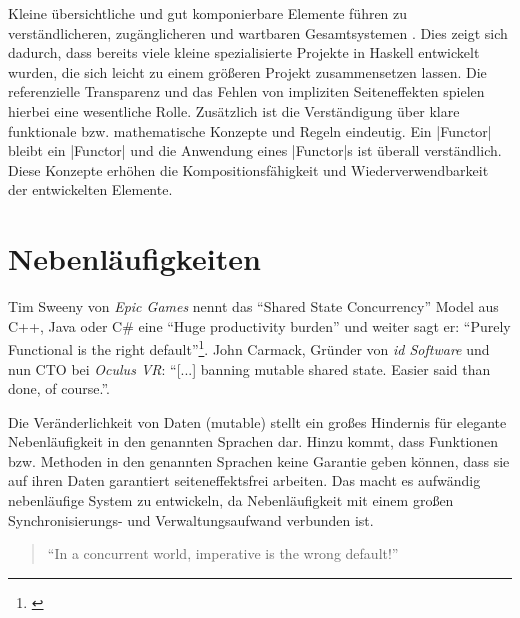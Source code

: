 Kleine übersichtliche und gut komponierbare Elemente führen zu verständlicheren, zugänglicheren und wartbaren Gesamtsystemen \parencite[Seite 12 ff.]{Stewart2015}. Dies zeigt sich dadurch, dass bereits viele kleine spezialisierte Projekte in Haskell entwickelt wurden, die sich leicht zu einem größeren Projekt zusammensetzen lassen. Die referenzielle Transparenz und das Fehlen von impliziten Seiteneffekten spielen hierbei eine wesentliche Rolle. Zusätzlich ist die Verständigung über klare funktionale bzw. mathematische Konzepte und Regeln eindeutig. Ein |Functor| bleibt ein |Functor| und die Anwendung eines |Functor|s ist überall verständlich. Diese Konzepte erhöhen die Kompositionsfähigkeit und Wiederverwendbarkeit der entwickelten Elemente.

\section{Nebenläufigkeiten}
\label{sec:nebenlaeufigkeiten}

Tim Sweeny von \textit{Epic Games} nennt das "`Shared State Concurrency"' Model aus C++, Java oder C\# eine "`Huge productivity burden"' und weiter sagt er: "`Purely Functional is the right default"'\footnote{\cite[Vgl.][Seite 42 u. Seite 56]{Sweeney2006}\label{note:sweeney-mainstream}}. John Carmack, Gründer von \textit{id Software} und nun CTO bei \textit{Oculus VR}: "`[...] banning mutable shared state. Easier said than done, of course."'.

Die Veränderlichkeit von Daten (mutable) stellt ein großes Hindernis für elegante Nebenläufigkeit in den genannten Sprachen dar. Hinzu kommt, dass Funktionen bzw. Methoden in den genannten Sprachen keine Garantie geben können, dass sie auf ihren Daten garantiert seiteneffektsfrei arbeiten. Das macht es aufwändig nebenläufige System zu entwickeln, da Nebenläufigkeit mit einem großen Synchronisierungs- und Verwaltungsaufwand verbunden ist.

\begin{quote}
"`In a concurrent world, imperative is the wrong default!"'
\end{quote}


